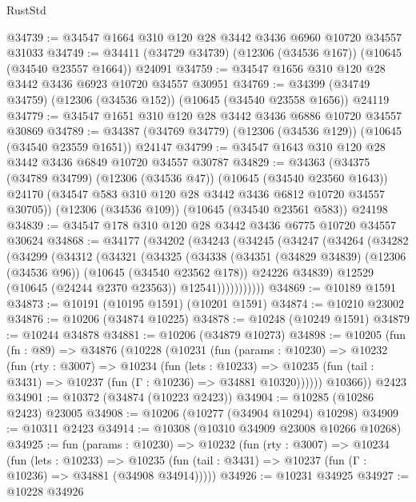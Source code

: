 \begin{lexlean}{RustStd}
\begin{coremodule}
@34739 := @34547 @1664 @310 @120 @28 @3442 @3436 @6960 @10720 @34557 @31033
@34749 := @34411 (@34729 @34739) (@12306 (@34536 @167)) (@10645 (@34540 @23557 @1664)) @24091
@34759 := @34547 @1656 @310 @120 @28 @3442 @3436 @6923 @10720 @34557 @30951
@34769 := @34399 (@34749 @34759) (@12306 (@34536 @152)) (@10645 (@34540 @23558 @1656)) @24119
@34779 := @34547 @1651 @310 @120 @28 @3442 @3436 @6886 @10720 @34557 @30869
@34789 := @34387 (@34769 @34779) (@12306 (@34536 @129)) (@10645 (@34540 @23559 @1651)) @24147
@34799 := @34547 @1643 @310 @120 @28 @3442 @3436 @6849 @10720 @34557 @30787
@34829 := @34363
    (@34375
      (@34789 @34799)
      (@12306 (@34536 @47))
      (@10645 (@34540 @23560 @1643))
      @24170
      (@34547 @583 @310 @120 @28 @3442 @3436 @6812 @10720 @34557 @30705))
    (@12306 (@34536 @109))
    (@10645 (@34540 @23561 @583))
    @24198
@34839 := @34547 @178 @310 @120 @28 @3442 @3436 @6775 @10720 @34557 @30624
@34868 := @34177
    (@34202
      (@34243
        (@34245
          (@34247
            (@34264
              (@34282
                (@34299
                  (@34312
                    (@34321
                      (@34325
                        (@34338
                          (@34351
                            (@34829 @34839)
                            (@12306 (@34536 @96))
                            (@10645 (@34540 @23562 @178))
                            @24226
                            @34839)
                          @12529
                          (@10645 (@24244 @2370 @23563))
                          @12541)))))))))))
@34869 := @10189 @1591
@34873 := @10191 (@10195 @1591) (@10201 @1591)
@34874 := @10210 @23002
@34876 := @10206 (@34874 @10225)
@34878 := @10248 (@10249 @1591)
@34879 := @10244 @34878
@34881 := @10206 (@34879 @10273)
@34898 := @10205
    (fun (fn : @89) =>
    @34876
      (@10228
        (@10231
          (fun (params : @10230) =>
          @10232
            (fun (rty : @3007) =>
            @10234
              (fun (lets : @10233) =>
              @10235 (fun (tail : @3431) => @10237 (fun (Γ : @10236) => @34881 @10320))))))
        @10366))
    @2423
@34901 := @10372 (@34874 (@10223 @2423))
@34904 := @10285 (@10286 @2423) @23005
@34908 := @10206 (@10277 (@34904 @10294) @10298)
@34909 := @10311 @2423
@34914 := @10308 (@10310 @34909 @23008 @10266 @10268)
@34925 := fun (params : @10230) =>
  @10232
    (fun (rty : @3007) =>
    @10234
      (fun (lets : @10233) =>
      @10235 (fun (tail : @3431) => @10237 (fun (Γ : @10236) => @34881 (@34908 @34914)))))
@34926 := @10231 @34925
@34927 := @10228 @34926

\end{coremodule}
\end{lexlean}
